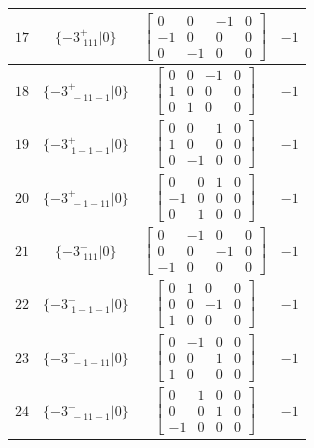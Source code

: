\documentclass[fleqn,8pt]{jsarticle}
\begin{document}
\begin{longtable}{cccc}
$ 17 $ & $ \{-3^{+}_{\,\,111}|0\} $ & $ \begin{bmatrix} 0 & 0 & -1 & 0 \\ -1 & 0 & 0 & 0 \\ 0 & -1 & 0 & 0 \end{bmatrix} $ & $ -1 $ \\ \hline
$ 18 $ & $ \{-3^{+}_{\,\,-11-1}|0\} $ & $ \begin{bmatrix} 0 & 0 & -1 & 0 \\ 1 & 0 & 0 & 0 \\ 0 & 1 & 0 & 0 \end{bmatrix} $ & $ -1 $ \\ \hline
$ 19 $ & $ \{-3^{+}_{\,\,1-1-1}|0\} $ & $ \begin{bmatrix} 0 & 0 & 1 & 0 \\ 1 & 0 & 0 & 0 \\ 0 & -1 & 0 & 0 \end{bmatrix} $ & $ -1 $ \\ \hline
$ 20 $ & $ \{-3^{+}_{\,\,-1-11}|0\} $ & $ \begin{bmatrix} 0 & 0 & 1 & 0 \\ -1 & 0 & 0 & 0 \\ 0 & 1 & 0 & 0 \end{bmatrix} $ & $ -1 $ \\ \hline
$ 21 $ & $ \{-3^{-}_{\,\,111}|0\} $ & $ \begin{bmatrix} 0 & -1 & 0 & 0 \\ 0 & 0 & -1 & 0 \\ -1 & 0 & 0 & 0 \end{bmatrix} $ & $ -1 $ \\ \hline
$ 22 $ & $ \{-3^{-}_{\,\,1-1-1}|0\} $ & $ \begin{bmatrix} 0 & 1 & 0 & 0 \\ 0 & 0 & -1 & 0 \\ 1 & 0 & 0 & 0 \end{bmatrix} $ & $ -1 $ \\ \hline
$ 23 $ & $ \{-3^{-}_{\,\,-1-11}|0\} $ & $ \begin{bmatrix} 0 & -1 & 0 & 0 \\ 0 & 0 & 1 & 0 \\ 1 & 0 & 0 & 0 \end{bmatrix} $ & $ -1 $ \\ \hline
$ 24 $ & $ \{-3^{-}_{\,\,-11-1}|0\} $ & $ \begin{bmatrix} 0 & 1 & 0 & 0 \\ 0 & 0 & 1 & 0 \\ -1 & 0 & 0 & 0 \end{bmatrix} $ & $ -1 $ \\
\end{longtable}
\end{document}

